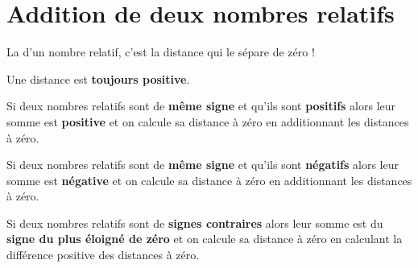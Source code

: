 \section{Addition de deux nombres relatifs}
\begin{definition}
  La  d'un nombre relatif, c’est la distance qui le sépare de zéro !

  Une distance est \textbf{toujours positive}.
\end{definition}

\begin{propriete}[\admise]
  Si deux nombres relatifs sont de \textbf{même signe} et qu’ils sont \textbf{positifs} 
  alors leur somme est \textbf{positive} et on calcule sa distance à zéro en additionnant les distances à zéro.
\end{propriete}

\begin{propriete}[\admise]
  Si deux nombres relatifs sont de \textbf{même signe} et qu’ils sont \textbf{négatifs}
  alors leur somme est \textbf{négative} et on calcule sa distance à zéro en additionnant les distances à zéro.
\end{propriete}

\begin{propriete}[\admise]
  Si deux nombres relatifs sont de \textbf{signes contraires}
  alors leur somme est du \textbf{signe du plus éloigné de zéro} et on calcule sa distance à zéro en calculant la différence positive des distances à zéro.
\end{propriete}

